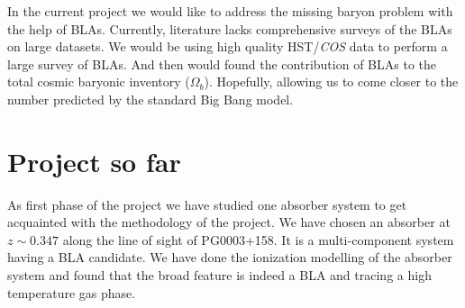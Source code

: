 \documentclass[12pt,oneside,noprintercorrection]{iut}
\begin{document}
In the current project we would like to address the missing baryon problem with the help of BLAs. Currently, literature lacks comprehensive surveys of the BLAs on large datasets. We would be using high quality HST/\textit{COS} data to perform a large survey of BLAs. And then would found the contribution of BLAs to the total cosmic baryonic inventory ($\Omega_b$). Hopefully, allowing us to come closer to the number predicted by the standard Big Bang model.  

\section*{Project so far}

As first phase of the project we have studied one absorber system to get acquainted with the methodology of the project. We have chosen an absorber at $z\sim0.347$ along the line of sight of PG0003+158. It is a multi-component system having a BLA candidate. We have done the ionization modelling of the absorber system and found that the broad feature is indeed a BLA and tracing a high temperature gas phase.







\end{document}
